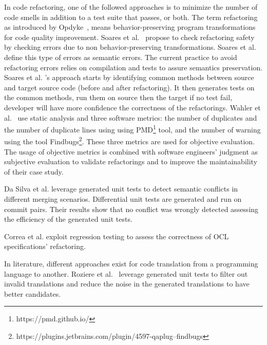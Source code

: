 In code refactoring, one of the followed approaches is to minimize the number of code smells in addition to a test suite that passes, or both.
The term refactoring as introduced by Opdyke~\cite{10.5555/169783}, means behavior-preserving program transformations for code quality improvement. 
Soares et al.~\cite{soares2009generating} propose to check refactoring safety by checking errors due to non behavior-preserving transformations. Soares et al.~\cite{soares2009generating} define this type of errors as semantic errors. The current practice to avoid refactoring errors relies on compilation and tests to assure semantics preservation. Soares et al. \cite{soares2009generating}'s approach starts by identifying common methods between source and target source code (before and after refactoring). It then generates tests on the common methods, run them on source then the target if no test fail, developer will have more confidence the correctness of the refactorings.
Wahler et al.~\cite{7816501} use static analysis and three software metrics: the number of duplicates and the number of duplicate lines using using PMD\footnote{https://pmd.github.io/} tool, and the number of warning using the tool Findbugs\footnote{https://plugins.jetbrains.com/plugin/4597-qaplug--findbugs}. These three metrics are used for objective evaluation. The usage of objective metrics is combined with software engineers' judgment as subjective evaluation to validate refactorings and to improve the maintainability of their case study.

Da Silva et al. \cite{DASILVA2024112070} leverage generated unit tests to detect semantic conflicts in different merging scenarios. Differential unit tests are generated and run on commit pairs. Their results show that no conflict was wrongly detected assessing the efficiency of the generated unit tests.

Correa et al. \cite{correa2007refactoring} exploit regression testing to assess the correctness of OCL specifications' refactoring.


In literature, different approaches exist for code translation from a programming language to another. Roziere et al.~\cite{roziere2021leveraging} leverage generated unit tests to filter out invalid translations and reduce the noise in the generated translations to have better candidates.
 
